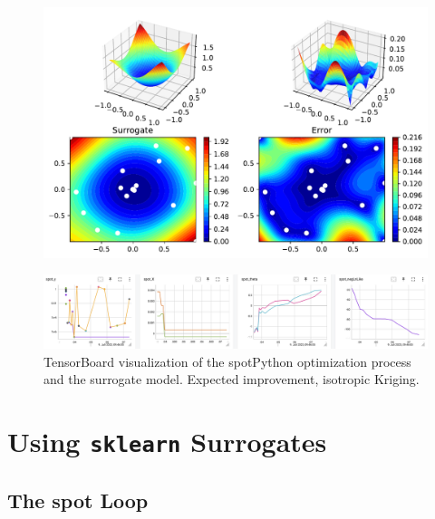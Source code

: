 \documentclass[
  letterpaper,
  DIV=11,
  numbers=noendperiod]{scrreprt}
\begin{document}
\begin{figure}[H]

{\centering \includegraphics{07_spot_ei_files/figure-pdf/cell-17-output-1.pdf}

}

\end{figure}

\begin{figure}

{\centering \includegraphics[width=1\textwidth,height=\textheight]{figures_static/07_tensorboard_EI_NONISO.png}

}

\caption{TensorBoard visualization of the spotPython optimization
process and the surrogate model. Expected improvement, isotropic
Kriging.}

\end{figure}

\hypertarget{using-sklearn-surrogates}{%
\section{\texorpdfstring{Using \texttt{sklearn}
Surrogates}{Using sklearn Surrogates}}\label{using-sklearn-surrogates}}

\hypertarget{the-spot-loop}{%
\subsection{The spot Loop}\label{the-spot-loop}}
\end{document}

